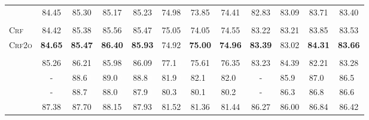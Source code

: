 \documentclass[11pt]{article}
\newcommand{\white}[1]{\textcolor{white}{#1}}
\begin{document}
\begin{table*}[tb!]
\begin{small}
\begin{tabular}{L c ccc ccc c ccc}
            \citet{zhang-etal-2021-comparing}                                 & 84.45                       & 85.30                       & 85.17                     & 85.23          & 74.98                    & 73.85          & 74.41          & 82.83          & 83.09                  & 83.71          & 83.40          \\\\[-10pt]
            \textsc{Crf}                                                      & 84.42                       & 85.38                       & 85.56                     & 85.47          & 75.05                    & 74.05          & 74.55          & 83.22          & 83.21                  & 83.85          & 83.53          \\
            \textsc{Crf2o}                                                    & \textbf{84.65}              & \textbf{85.47}              & \textbf{86.40}            & \textbf{85.93} & 74.92                    & \textbf{75.00} & \textbf{74.96} & \textbf{83.39} & 83.02                  & \textbf{84.31} & \textbf{83.66} \\\\[-10pt]
            \citet{strubell-etal-2018-lisa}            & 85.26                       & 86.21                       & 85.98                     & 86.09          & 77.1\white{0}            & 75.61          & 76.35          & 83.23          & 84.39                  & 82.21          & 83.28          \\
            \citet{shi-etal-2019-simple}               & -                           & 88.6\white{0}               & 89.0\white{0}             & 88.8\white{0}  & 81.9\white{0}            & 82.1\white{0}  & 82.0\white{0}  & -              & 85.9\white{0}          & 87.0\white{0}  & 86.5\white{0}  \\
            \citet{jindal-etal-2020-improved}          & -                           & 88.7\white{0}               & 88.0\white{0}             & 87.9\white{0}  & 80.3\white{0}            & 80.1\white{0}  & 80.2\white{0}  & -              & 86.3\white{0}          & 86.8\white{0}  & 86.6\white{0}  \\
            \citet{zhang-etal-2021-comparing}   & 87.38                       & 87.70                       & 88.15                     & 87.93          & 81.52                    & 81.36          & 81.44          & 86.27          & 86.00                  & 86.84          & 86.42          \\

\end{tabular}
\end{small}
\end{table*}
\end{document}
